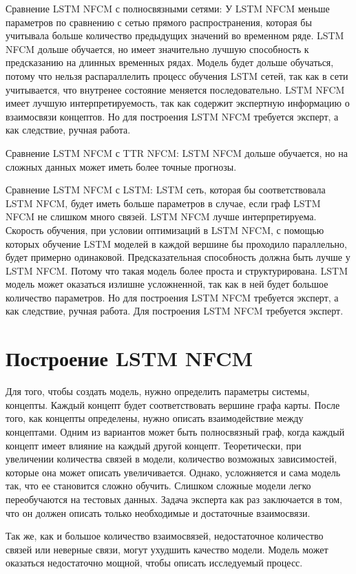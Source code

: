 Сравнение LSTM NFCM с полносвязными сетями:
У LSTM NFCM меньше параметров по сравнению с сетью прямого распространения,
которая бы учитывала больше количество предыдущих значений во временном ряде.
LSTM NFCM дольше обучается, но имеет значительно лучшую способность к предсказанию
на длинных временных рядах.
Модель будет дольше обучаться, потому что нельзя распараллелить
процесс обучения LSTM сетей, так как в сети учитывается, что внутренее состояние меняется последовательно.
LSTM NFCM имеет лучшую интерпретируемость, так как содержит
экспертную информацию о взаимосвязи концептов.
Но для построения LSTM NFCM требуется эксперт, а как следствие,
ручная работа.

Сравнение LSTM NFCM с TTR NFCM:
LSTM NFCM дольше обучается, но на сложных данных
может иметь более точные прогнозы.

Сравнение LSTM NFCM с LSTM:
LSTM сеть, которая бы соответствовала LSTM NFCM, будет иметь
больше параметров в случае, если граф LSTM NFCM не слишком
много связей. LSTM NFCM лучше интерпретируема.
Скорость обучения, при условии оптимизаций в LSTM NFCM, с
помощью которых обучение LSTM моделей в каждой вершине бы проходило
параллельно, будет примерно одинаковой.
Предсказательная способность должна быть лучше у LSTM NFCM.
Потому что такая модель более проста и структурирована.
LSTM модель может оказаться излишне усложненной, так как в ней будет
большое количество параметров.
Но для построения LSTM NFCM требуется эксперт, а как следствие,
ручная работа.
Для построения LSTM NFCM требуется эксперт.

\section{Построение LSTM NFCM}

Для того, чтобы создать модель, нужно определить параметры системы, концепты.
Каждый концепт будет соответствовать вершине графа карты.
После того, как концепты определены, нужно описать взаимодействие между концептами.
Одним из вариантов может быть полносвязный граф, когда каждый концепт имеет
влияние на каждый другой концепт. Теоретически, при увеличении количества
связей в модели, количество возможных зависимостей, которые она может описать
увеличивается. Однако, усложняется и сама модель так, что ее становится сложно обучить.
Слишком сложные модели легко переобучаются на тестовых данных.
Задача эксперта как раз заключается в том, что он должен
описать только необходимые и достаточные взаимосвязи.

Так же, как и большое количество взаимосвязей,
недостаточное количество связей или неверные связи, могут ухудшить
качество модели. Модель может оказаться недостаточно мощной, чтобы описать
исследуемый процесс.

